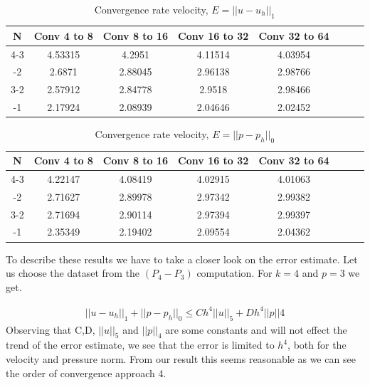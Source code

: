 \documentclass[a4paper,norsk]{article}
\begin{document}
\begin{table}[ht]
\caption {Convergence rate velocity, $E = ||u-u_h||_1$}
\centering
\begin{tabular}{c|ccccccc}
\hline
\rowcolor{LightCyan}
N  & Conv 4 to 8  &  Conv 8 to 16  &  Conv 16 to 32 &  Conv 32 to 64 \\
\hline
4-3   &     4.53315  &       4.2951   &        4.11514  & 4.03954 \\ \hline
\rowcolor{LightCyan} \hline
4-2    &    2.6871   &       2.88045  &        2.96138 & 2.98766 \\ \hline
3-2    &    2.57912  &       2.84778  &        2.9518 & 2.98466 \\ \hline
\rowcolor{LightCyan} \hline
3-1    &    2.17924  &       2.08939  &        2.04646 & 2.02452 \\
\hline
\end{tabular}
\end{table}


\begin{table}[ht]
\caption {Convergence rate velocity, $E = ||p-p_h||_0$}
\centering
\begin{tabular}{c|ccccccc}
\hline
\rowcolor{LightCyan}
N  & Conv 4 to 8  &  Conv 8 to 16  &  Conv 16 to 32 &  Conv 32 to 64\\
\hline
4-3   &     4.22147   &      4.08419   &       4.02915 & 4.01063  \\ \hline
\rowcolor{LightCyan} \hline
4-2   &     2.71627   &      2.89978   &       2.97342 & 2.99382  \\ \hline
3-2   &     2.71694   &      2.90114   &       2.97394 & 2.99397   \\ \hline
\rowcolor{LightCyan} \hline
3-1   &     2.35349   &      2.19402   &       2.09554 & 2.04362   \\
\hline
\end{tabular}
\end{table}

To describe these results we have to take a closer look on the error estimate. Let us choose the dataset from the $(P_4 - P_3)$
computation. For $k=4$ and $p=3$ we get.

\begin{align*}
 ||u - u_h||_1 + ||p - p_h||_0 \leq Ch^4||u||_{5} + Dh^{4} ||p||{4}
\end{align*}
Observing that C,D, $||u||_{5}$ and $||p||_{4}$ are some constants and will not effect the trend of the error estimate, we see that
the error is limited to $h^4$, both for the velocity and pressure norm. From our result this seems reasonable as we can see the order of convergence
approach 4.
\end{document}

